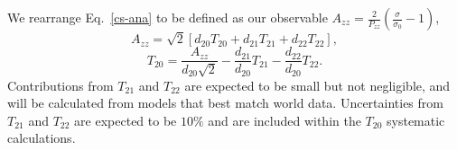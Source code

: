 We rearrange Eq.~\ref{cs-ana} to be defined as our observable $A_{zz} = \frac{2}{P_{zz}}\left( \frac{\sigma}{\sigma_0} - 1 \right)$,
\begin{equation}A_{zz} = \sqrt{2} \left[ d_{20} T_{20} + d_{21} T_{21} + d_{22} T_{22}\right],
\end{equation}
\begin{equation}
T_{20} = \frac{A_{zz}}{d_{20}\sqrt{2}}-\frac{d_{21}}{d_{20}}T_{21}-\frac{d_{22}}{d_{20}}T_{22}.
\end{equation}
Contributions from $T_{21}$ and $T_{22}$ are expected to be small but not negligible, and will be calculated from models that best match world data. Uncertainties from $T_{21}$ and $T_{22}$ are expected to be $10\%$ and are included within the $T_{20}$ systematic calculations.


